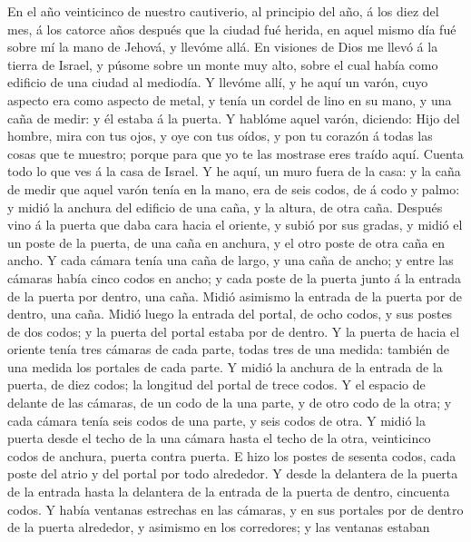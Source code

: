  En el año veinticinco de nuestro cautiverio, al principio
del año, á los diez del mes, á los catorce años después que la ciudad
fué herida, en aquel mismo día fué sobre mí la mano de Jehová, y llevóme
allá.  En visiones de Dios me llevó á la tierra de Israel, y
púsome sobre un monte muy alto, sobre el cual había como edificio de una
ciudad al mediodía.  Y llevóme allí, y he aquí un varón,
cuyo aspecto era como aspecto de metal, y tenía un cordel de lino en su
mano, y una caña de medir: y él estaba á la puerta.  Y
hablóme aquel varón, diciendo: Hijo del hombre, mira con tus ojos, y oye
con tus oídos, y pon tu corazón á todas las cosas que te muestro; porque
para que yo te las mostrase eres traído aquí. Cuenta todo lo que ves á
la casa de Israel.  Y he aquí, un muro fuera de la casa: y
la caña de medir que aquel varón tenía en la mano, era de seis codos, de
á codo y palmo: y midió la anchura del edificio de una caña, y la
altura, de otra caña.  Después vino á la puerta que daba
cara hacia el oriente, y subió por sus gradas, y midió el un poste de la
puerta, de una caña en anchura, y el otro poste de otra caña en ancho.
 Y cada cámara tenía una caña de largo, y una caña de ancho;
y entre las cámaras había cinco codos en ancho; y cada poste de la
puerta junto á la entrada de la puerta por dentro, una caña.
 Midió asimismo la entrada de la puerta por de dentro, una
caña.  Midió luego la entrada del portal, de ocho codos, y
sus postes de dos codos; y la puerta del portal estaba por de dentro.
 Y la puerta de hacia el oriente tenía tres cámaras de cada
parte, todas tres de una medida: también de una medida los portales de
cada parte.  Y midió la anchura de la entrada de la puerta,
de diez codos; la longitud del portal de trece codos.  Y el
espacio de delante de las cámaras, de un codo de la una parte, y de otro
codo de la otra; y cada cámara tenía seis codos de una parte, y seis
codos de otra.  Y midió la puerta desde el techo de la una
cámara hasta el techo de la otra, veinticinco codos de anchura, puerta
contra puerta.  E hizo los postes de sesenta codos, cada
poste del atrio y del portal por todo alrededor.  Y desde
la delantera de la puerta de la entrada hasta la delantera de la entrada
de la puerta de dentro, cincuenta codos.  Y había ventanas
estrechas en las cámaras, y en sus portales por de dentro de la puerta
alrededor, y asimismo en los corredores; y las ventanas estaban

